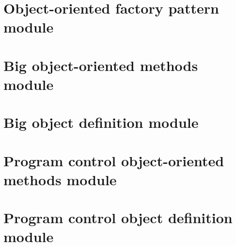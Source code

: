 \documentclass[11pt,twoside,a4paper]{report}
\begin{document}



\section{Object-oriented factory pattern module}
\label{sec:oopattern}


\clearpage


\section{Big object-oriented methods module}
\label{sec:oomethods}


\clearpage


\section{Big object definition module}
\label{sec:oodefinition}


\clearpage


\section{Program control object-oriented methods module}
\label{sec:controlmethods}


\clearpage


\section{Program control object definition module}
\label{sec:controldefinition}
\end{document}
